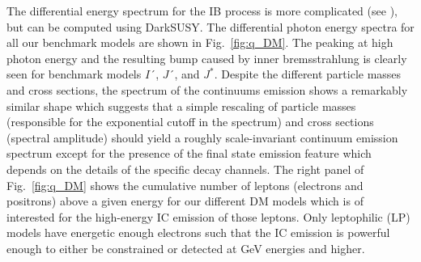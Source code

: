 \documentclass[10pt,aps,pra,reprint,amsmath,amsfonts,amssymb,showpacs,nofootinbib,floatfix]{revtex4-1}
\begin{document}
The differential energy spectrum for the IB process is more
complicated (see \cite{1989PhLB..225..372B,2008JHEP...01..049B}), but
can be computed using {\sc DarkSUSY}. The differential photon energy
spectra for all our benchmark models are shown in Fig.~\ref{fig:q_DM}.
The peaking at high photon energy and the resulting bump caused by
inner bremsstrahlung is clearly seen for benchmark models $I´$, $J´$,
and $J^*$. Despite the different particle masses and cross sections,
the spectrum of the continuums emission shows a remarkably similar
shape which suggests that a simple rescaling of particle masses
(responsible for the exponential cutoff in the spectrum) and cross
sections (spectral amplitude) should yield a roughly scale-invariant
continuum emission spectrum except for the presence of the final state
emission feature which depends on the details of the specific decay
channels. The right panel of Fig.~\ref{fig:q_DM} shows the cumulative
number of leptons (electrons and positrons) above a given energy for
our different DM models which is of interested for the high-energy IC
emission of those leptons.  Only leptophilic (LP) models have
energetic enough electrons such that the IC emission is powerful
enough to either be constrained or detected at GeV energies and
higher.
\end{document}
